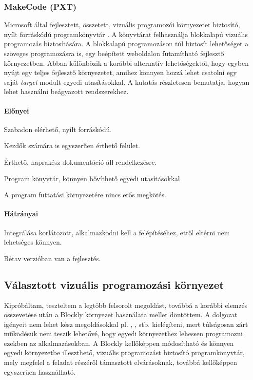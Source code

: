 \documentclass[12pt,a4paper,oneside]{report} %
\begin{document}
\subsubsection{MakeCode (PXT)}
\label{pxt}
Microsoft által fejlesztett, összetett, vizuális programozói környezetet biztosító, nyílt forráskódú programkönyvtár \cite{seneviratne2019makecode}. A  könyvtárat felhasználja blokkalapú vizuális programozás biztosítására. A blokkalapú programozáson túl biztosít lehetőséget a szöveges programozásra is, egy beépített weboldalon futamítható fejlesztő környezetben. Abban különbözik a korábbi alternatív lehetőségektől, hogy egyben nyújt egy teljes fejlesztő környezetet, amihez könnyen hozzá lehet csatolni egy saját \textit{target} modult egyedi utasításokkal. A \cite{devine2018makecode} kutatás részletesen bemutatja, hogyan lehet használni beágyazott rendszerekhez.
\paragraph{Előnyei} 
\begin{compactitem}
	\item Szabadon elérhető, nyílt forráskódú.
	\item Kezdők számára is egyszerűen érthető felület.
	\item Érthető, naprakész dokumentáció áll rendelkezésre.
	\item Program könyvtár, könnyen bővíthető egyedi utasításokkal
	\item A program futtatási környezetére nincs erős megkötés.
\end{compactitem}
\paragraph{Hátrányai} 
\begin{compactitem}
	\item Integrálása korlátozott, alkalmazkodni kell a felépítéséhez, ettől eltérni nem lehetséges könnyen.
	\item Bétav verzióban van a fejlesztés.
\end{compactitem}

\subsection{Választott vizuális programozási környezet}
Kipróbáltam, teszteltem a legtöbb felsorolt megoldást, továbbá a korábbi elemzés összevetése  után a Blockly környezet használata mellet döntöttem.
A dolgozat igényeit nem lehet kész megoldásokkal pl. , , stb. kielégíteni, mert túlságosan zárt működésük nem teszik lehetővé, hogy egyedi környezethez lehessen programozni ezekben az alkalmazásokban.
A Blockly kellőképpen módosítható és könnyen egyedi környezetbe illeszthető, vizuális programozást biztosító programkönyvtár, mely megfelel a feladat részéről támasztott elvárásoknak, továbbá kellőképpen egyszerűen használható.
\end{document}
